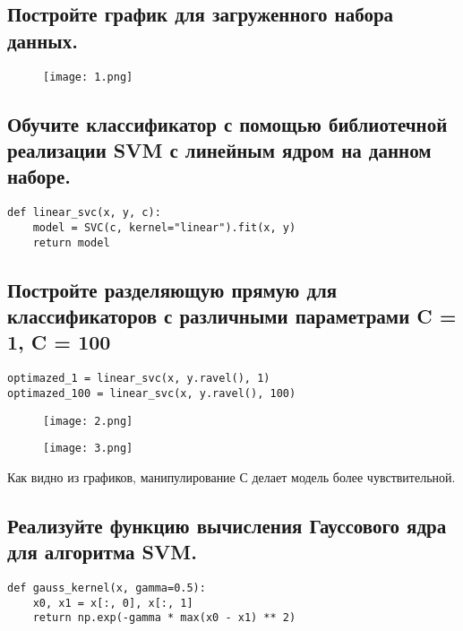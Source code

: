 \subsection{Постройте график для загруженного набора данных.}

\begin{figure}[h]
\centering
	\texttt{[image: 1.png]}
	\label{sec:purpose:payings}
\end{figure}

\subsection{Обучите классификатор с помощью библиотечной реализации SVM с линейным ядром на данном наборе.}

\begin{lstlisting}
def linear_svc(x, y, c):
    model = SVC(c, kernel="linear").fit(x, y)
    return model

\end{lstlisting}


\subsection{Постройте разделяющую прямую для классификаторов с различными параметрами C = 1, C = 100}

\begin{lstlisting}
optimazed_1 = linear_svc(x, y.ravel(), 1)
optimazed_100 = linear_svc(x, y.ravel(), 100)
\end{lstlisting}

\begin{figure}[h]
\centering
    \texttt{[image: 2.png]}
    \label{sec:purpose:payings}
\end{figure}

\begin{figure}[h]
\centering
    \texttt{[image: 3.png]}
    \label{sec:purpose:payings}
\end{figure}

Как видно из графиков, манипулирование С делает модель более чувствительной.

\subsection{Реализуйте функцию вычисления Гауссового ядра для алгоритма SVM.}

\begin{lstlisting}
def gauss_kernel(x, gamma=0.5):
    x0, x1 = x[:, 0], x[:, 1]
    return np.exp(-gamma * max(x0 - x1) ** 2)
\end{lstlisting}

